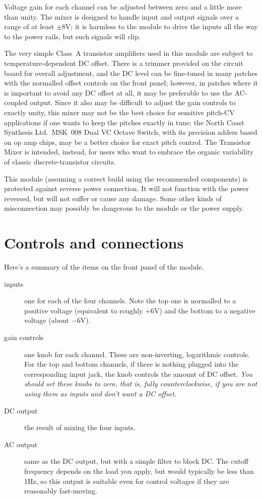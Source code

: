 Voltage gain for each channel can be adjusted between zero and a little more
than unity.  The mixer is designed to handle input and output signals over a
range of at least $\pm$8V; it is harmless to the module to drive the inputs
all the way to the power rails, but such signals will clip.

The very simple Class~A transistor amplifiers used in this module are
subject to temperature-dependent DC offset.  There is a trimmer provided on
the circuit board for overall adjustment, and the DC level can be fine-tuned
in many patches with the normalled offset controls on the front panel;
however, in patches where it is important to avoid any DC offset at all, it
may be preferable to use the AC-coupled output.  Since it also may be
difficult to adjust the gain controls to exactly unity, this mixer may not
be the best choice for sensitive pitch-CV applications if one wants to keep
the pitches exactly in tune; the North Coast Synthesis Ltd.\ MSK~008 Dual VC
Octave Switch, with its precision adders based on op amp chips, may
be a better choice for exact pitch control.  The Transistor Mixer is
intended, instead, for users who want to embrace the organic variability of
classic discrete-transistor circuits.

This module (assuming a correct build using the recommended components) is
protected against reverse power connection.  It will not function with the
power reversed, but will not suffer or cause any damage.  Some other kinds
of misconnection may possibly be dangerous to the module or the power
supply.

\section{Controls and connections}

Here's a summary of the items on the front panel of the module.

\begin{description}
  \item[inputs] one for each of the four channels.  Note the
  top one is normalled to a positive voltage (equivalent to roughly $+$6V)
  and the bottom to a negative voltage (about $-$6V).

  \item[gain controls] one knob for each channel.  These are non-inverting,
  logarithmic controls.  For the top and bottom channels, if there is nothing
  plugged into the corresponding input jack, the knob controls the amount
  of DC offset.  \emph{You should set these knobs to zero, that is, fully
  counterclockwise, if you are not using them as inputs and don't want a DC
  offset.}

  \item[DC output] the result of mixing the four inputs.
  
  \item[AC output] same as the DC output, but with a simple filter to block
  DC.  The cutoff frequency depends on the load you apply, but would
  typically be less than 1Hz, so this output is suitable even for control
  voltages if they are reasonably fast-moving.
\end{description}

